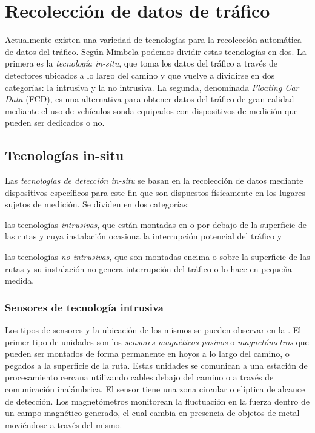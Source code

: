 \chapter{Recolección de datos de tráfico}
\label{cap:3}

Actualmente existen una variedad de tecnologías para la recolección automática de datos del tráfico. Según Mimbela \cite{mimbela2003summary} podemos dividir estas tecnologías en dos. La primera es la \emph{tecnología in-situ}, que toma los datos del tráfico a través de detectores ubicados a lo largo del camino y que vuelve a dividirse en dos categorías: la intrusiva y la no intrusiva. La segunda, denominada \emph{Floating Car Data} (FCD), es una alternativa para obtener datos del tráfico de gran calidad mediante el uso de vehículos sonda equipados con dispositivos de medición que pueden ser dedicados o no.

\section{Tecnologías in-situ}

Las \emph{tecnologías de detección in-situ} se basan en la recolección de datos mediante dispositivos específicos para este fin que son dispuestos físicamente en los lugares sujetos de medición. Se dividen en dos categorías: \begin{enumerate*}[a)] \item las tecnologías \emph{intrusivas}, que están montadas en o por debajo de la superficie de las rutas y cuya instalación ocasiona la interrupción potencial del tráfico y \item las tecnologías \emph{no intrusivas}, que son montadas encima o sobre la superficie de las rutas y su instalación no genera interrupción del tráfico o lo hace en pequeña medida.\end{enumerate*}

\subsection{Sensores de tecnología intrusiva}

Los tipos de sensores y la ubicación de los mismos se pueden observar en la . El primer tipo de unidades son los \emph{sensores magnéticos pasivos} o  \emph{magnetómetros} que pueden ser montados de forma permanente en hoyos a lo largo del camino, o pegados a la superficie de la ruta. Estas unidades se comunican a una estación de procesamiento cercana utilizando cables debajo del camino o a través de comunicación inalámbrica. El sensor tiene una zona circular o elíptica de alcance de detección. Los magnetómetros monitorean la fluctuación en la fuerza dentro de un campo magnético generado, el cual cambia en presencia de objetos de metal moviéndose a través del mismo.

